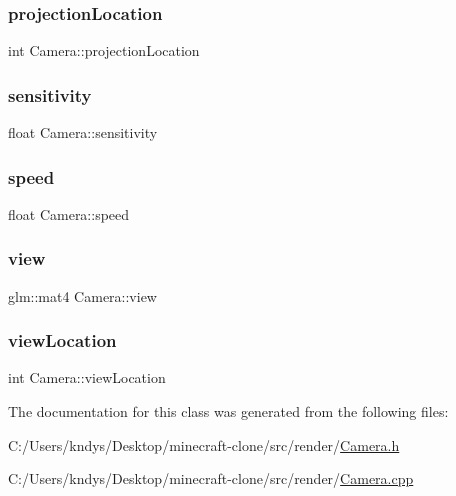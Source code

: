 \mbox{\label{class_camera_ac36bf5e482e8a82b118e0bcf8f617a5c}} 
\subsubsection{\texorpdfstring{projection\+Location}{projectionLocation}}
{\footnotesize\ttfamily int Camera\+::projection\+Location}

\mbox{\label{class_camera_a5431c8caefafb42a667ca4c801bef07f}} 
\subsubsection{\texorpdfstring{sensitivity}{sensitivity}}
{\footnotesize\ttfamily float Camera\+::sensitivity}

\mbox{\label{class_camera_a2960f533df18fe6d7d574c316c6d217a}} 
\subsubsection{\texorpdfstring{speed}{speed}}
{\footnotesize\ttfamily float Camera\+::speed}

\mbox{\label{class_camera_add93fedd6b9a6a6e2c784aeda624de83}} 
\subsubsection{\texorpdfstring{view}{view}}
{\footnotesize\ttfamily glm\+::mat4 Camera\+::view}

\mbox{\label{class_camera_a0640e08466574276525f91826c0691c6}} 
\subsubsection{\texorpdfstring{view\+Location}{viewLocation}}
{\footnotesize\ttfamily int Camera\+::view\+Location}



The documentation for this class was generated from the following files\+:\begin{DoxyCompactItemize}
\item 
C\+:/\+Users/kndys/\+Desktop/minecraft-\/clone/src/render/\mbox{\hyperlink{_camera_8h}{Camera.\+h}}\item 
C\+:/\+Users/kndys/\+Desktop/minecraft-\/clone/src/render/\mbox{\hyperlink{_camera_8cpp}{Camera.\+cpp}}\end{DoxyCompactItemize}
